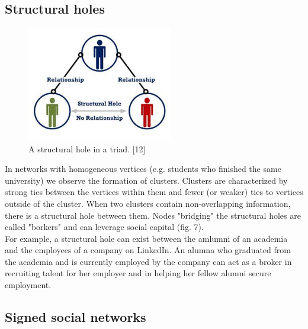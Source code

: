 \documentclass[conference,letterpaper]{IEEEtran}
\begin{document}
\subsection{Structural holes}
\begin{center}
\begin{figure}[hb]
\centering
\includegraphics[width=2.5in]{structural_hole}
\caption{
A structural hole in a triad. [12]
}
\label{fig_sim}
\end{figure}
\end{center}
In networks with homogeneous vertices (e.g. students who finished the same university) we observe the
formation of clusters. Clusters are characterized by strong ties between the vertices within them and fewer
(or weaker) ties to vertices outside of the cluster. When two clusters contain non-overlapping information,
there is a structural hole between them. Nodes "bridging" the structural holes are called "borkers" and can
leverage social capital (fig. 7). \\
For example, a structural hole can exist between the amlumni of an academia and the employees of a company
on LinkedIn. An alumna who graduated from the academia and is currently employed by the company can act as
a broker in recruiting talent for her employer and in helping her fellow alumni secure employment.\\

\subsection{Signed social networks}
\end{document}
